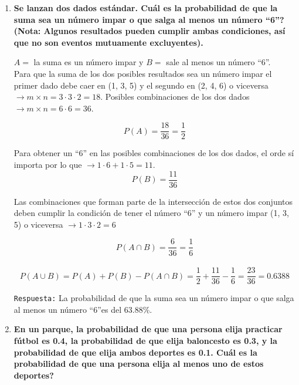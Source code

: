 \documentclass[12pt]{article}
\begin{document}
\begin{enumerate}[label=\textbf{\arabic*.}]
        
        \item \textbf{Se lanzan dos dados estándar. \textquestiondown Cuál es la probabilidad de que la suma sea un
        número impar o que salga al menos un número ``6''? (Nota: Algunos resultados
        pueden cumplir ambas condiciones, así que no son eventos mutuamente
        excluyentes).}

        $A = $ la suma es un número impar y $B = $ sale al menos un número ``6''.\\

        Para que la suma de los dos posibles resultados sea un número impar el primer dado debe caer en (1, 3, 5) y el
        segundo en (2, 4, 6) o viceversa $\rightarrow m \times n = 3 \cdot 3 \cdot 2 = 18$. Posibles combinaciones de los
        dos dados $\rightarrow m \times n = 6 \cdot 6 = 36$.

        \[P(A) = \frac{18}{36} = \frac{1}{2}\]

        Para obtener un ``6'' en las posibles combinaciones de los dos dados, el orde sí importa por lo que 
        $\rightarrow 1 \cdot 6 + 1 \cdot 5 = 11$. \\

        \[P(B) = \frac{11}{36}\]

        Las combinaciones que forman parte de la intersección de estos dos conjuntos deben cumplir la condición de tener el número ``6'' 
        y un número impar (1, 3, 5) o viceversa $\rightarrow 1 \cdot 3 \cdot 2 = 6$

        \[P(A \cap B) = \frac{6}{36} = \frac{1}{6}\] \\

        \[P(A \cup B) = P(A) + P(B) - P(A \cap B) = \frac{1}{2} + \frac{11}{36} - \frac{1}{6} = \frac{23}{36} = 0.6388\]

        \texttt{Respuesta:} La probabilidad de que la suma sea un número impar o que salga al menos un número ``6''es del 63.88\%.


        
        \item \textbf{En un parque, la probabilidad de que una persona elija practicar fútbol es 0.4, la
        probabilidad de que elija baloncesto es 0.3, y la probabilidad de que elija ambos
        deportes es 0.1. \textquestiondown Cuál es la probabilidad de que una persona elija al menos uno
        de estos deportes?}


\end{enumerate}
\end{document}
